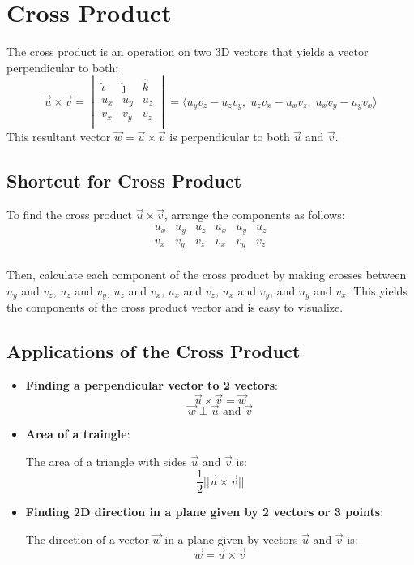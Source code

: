 \documentclass[a4paper,12pt,openany]{book}
\newcommand{\uniti}{
    \hat{\iota}
}
\newcommand{\unitj}{
    \hat{\jmath}
}
\newcommand{\unitk}{
    \hat{k}
}
\begin{document}
\section{Cross Product}
The cross product is an operation on two 3D vectors that yields a vector perpendicular to both:
\[
    \vec{u} \times \vec{v} = 
    \begin{vmatrix}
        \uniti & \unitj & \unitk \\
        u_x & u_y & u_z \\
        v_x & v_y & v_z \\
    \end{vmatrix} 
    = \langle u_y v_z - u_z v_y, \; u_z v_x - u_x v_z, \; u_x v_y - u_y v_x \rangle
\]
This resultant vector \(\vec{w} = \vec{u} \times \vec{v}\) is perpendicular to both \(\vec{u}\) and \(\vec{v}\).
\subsection{Shortcut for Cross Product}

To find the cross product \(\vec{u} \times \vec{v}\), arrange the components as follows:
\[
\begin{array}{|cccccc|}
    u_x & u_y & u_z & u_x & u_y & u_z \\
    v_x & v_y & v_z & v_x & v_y & v_z \\
\end{array}
\]

Then, calculate each component of the cross product by making crosses between $u_y$ and $v_z$, $u_z$ and $v_y$, $u_z$ and $v_x$, $u_x$ and $v_z$, $u_x$ and $v_y$, and $u_y$ and $v_x$. This yields the components of the cross product vector and is easy to visualize.
\subsection{Applications of the Cross Product}
\begin{itemize}
    \item \textbf{Finding a perpendicular vector to 2 vectors}:
    \[
        \vec{u} \times \vec{v} = \vec{w}
    \]
    \[
        \vec{w} \perp \vec{u} \text{ and } \vec{v} 
    \]
    \item \textbf{Area of a traingle}:
    
    The area of a triangle with sides \(\vec{u}\) and \(\vec{v}\) is:
    \[
        \dfrac{1}{2} ||\vec{u} \times \vec{v}||
    \]
    \item \textbf{Finding 2D direction in a plane given by 2 vectors or 3 points}:
    
    The direction of a vector \(\vec{w}\) in a plane given by vectors \(\vec{u}\) and \(\vec{v}\) is:
    \[
        \vec{w} = \vec{u} \times \vec{v}
    \]
\end{itemize}
\end{document}
